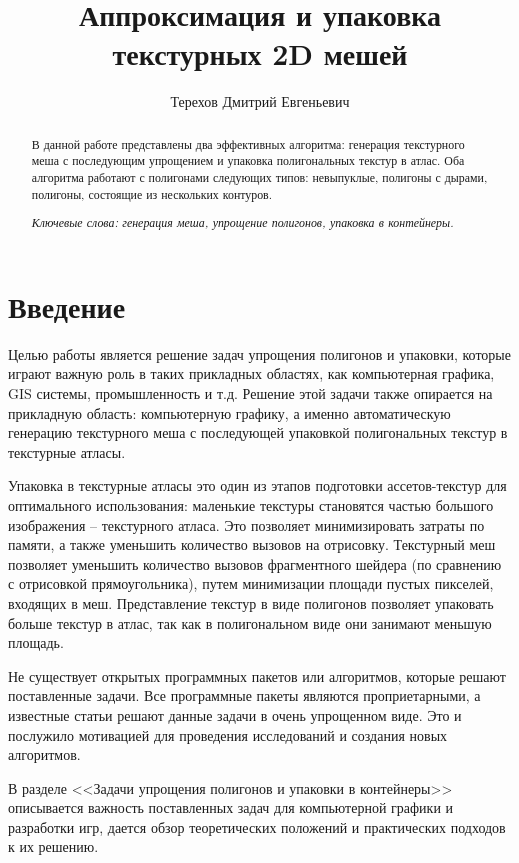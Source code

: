 \documentclass{fefu_thesis/cls/fefu}
\author{Терехов Дмитрий Евгеньевич}
\title{Аппроксимация и упаковка текстурных 2D мешей}
\begin{document}
    \begin{abstract}
        В данной работе представлены два эффективных алгоритма: генерация текстурного меша с последующим упрощением и упаковка полигональных текстур в атлас. Оба алгоритма работают с полигонами следующих типов: невыпуклые, полигоны с дырами, полигоны, состоящие из нескольких контуров.

        \textit{Ключевые слова: генерация меша, упрощение полигонов, упаковка в контейнеры.}
    \end{abstract}
    \pagebreak
    \tableofcontents
    \pagebreak
    {\centering\section*{Введение}}
    Целью работы является решение задач упрощения полигонов и упаковки, которые играют важную роль в таких прикладных областях, как компьютерная графика, GIS системы, промышленность и т.д. Решение этой задачи также опирается на прикладную область: компьютерную графику, а именно автоматическую генерацию текстурного меша с последующей упаковкой полигональных текстур в текстурные атласы.

    Упаковка в текстурные атласы это один из этапов подготовки ассетов-текстур для оптимального использования: маленькие текстуры становятся частью большого изображения -- текстурного атласа. Это позволяет минимизировать затраты по памяти, а также уменьшить количество вызовов на отрисовку. Текстурный меш позволяет уменьшить количество вызовов фрагментного шейдера (по сравнению с отрисовкой прямоугольника), путем минимизации площади пустых пикселей, входящих в меш. Представление текстур в виде полигонов позволяет упаковать больше текстур в атлас, так как в полигональном виде они занимают меньшую площадь.

    Не существует открытых программных пакетов или алгоритмов, которые решают поставленные задачи. Все программные пакеты являются проприетарными, а известные статьи решают данные задачи в очень упрощенном виде. Это и послужило мотивацией для проведения исследований и создания новых алгоритмов.

    В разделе <<Задачи упрощения полигонов и упаковки в контейнеры>> описывается важность поставленных задач для компьютерной графики и разработки игр, дается обзор теоретических положений и практических подходов к их решению.
\end{document}
